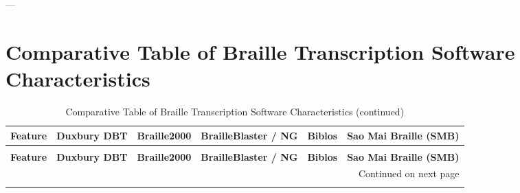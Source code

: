 ---

\section{Comparative Table of Braille Transcription Software Characteristics}

\begin{longtable}{|p{2.5cm}|p{2cm}|p{2cm}|p{2.5cm}|p{2.5cm}|p{2.5cm}|}
\caption{Comparative Table of Braille Transcription Software Characteristics}
\label{tab:braille_software_comparison}\\
\hline
\textbf{Feature} & \textbf{Duxbury DBT} & \textbf{Braille2000} & \textbf{BrailleBlaster / NG} & \textbf{Biblos} & \textbf{Sao Mai Braille (SMB)} \\
\hline
\endfirsthead
\caption{Comparative Table of Braille Transcription Software Characteristics (continued)}\\
\hline
\textbf{Feature} & \textbf{Duxbury DBT} & \textbf{Braille2000} & \textbf{BrailleBlaster / NG} & \textbf{Biblos} & \textbf{Sao Mai Braille (SMB)} \\
\hline
\endhead
\hline
\multicolumn{6}{|r|}{Continued on next page} \\
\hline
\endfoot
\hline
\endlastfoot


\end{longtable}
